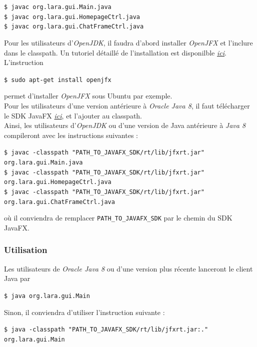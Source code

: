 \documentclass[10pt,a4paper]{article}
\begin{document}
\begin{center}
	\texttt{\$ javac org.lara.gui.Main.java} \\
	\texttt{\$ javac org.lara.gui.HomepageCtrl.java}\\
	\texttt{\$ javac org.lara.gui.ChatFrameCtrl.java}
\end{center}

Pour les utilisateurs d'\textit{OpenJDK}, il faudra d'abord installer \textit{OpenJFX} et l'inclure dans le classpath. Un tutoriel détaillé de l'installation est disponilble \href{https://wiki.openjdk.java.net/display/OpenJFX/Building+OpenJFX}{\textit{ici}}. L'instruction

\begin{center}
	\texttt{\$ sudo apt-get install openjfx}
\end{center}
permet d'installer \textit{OpenJFX} sous Ubuntu par exemple. \\

Pour les utilisateurs d'une version antérieure à \textit{Oracle Java 8}, il faut télécharger le SDK JavaFX \href{https://gluonhq.com/products/javafx/}{\textit{ici}}, et l'ajouter au classpath. \\

Ainsi, les utilisateurs d'\textit{OpenJDK} ou d'une version de Java antérieure à \textit{Java 8} compileront avec les instructions suivantes :
\begin{center}
	\texttt{\$ javac -classpath "PATH\_TO\_JAVAFX\_SDK/rt/lib/jfxrt.jar" org.lara.gui.Main.java} \\
	\texttt{\$ javac -classpath "PATH\_TO\_JAVAFX\_SDK/rt/lib/jfxrt.jar" org.lara.gui.HomepageCtrl.java} \\
	\texttt{\$ javac -classpath "PATH\_TO\_JAVAFX\_SDK/rt/lib/jfxrt.jar" org.lara.gui.ChatFrameCtrl.java}
\end{center}
où il conviendra de remplacer \texttt{PATH\_TO\_JAVAFX\_SDK} par le chemin du SDK JavaFX.

\subsubsection{Utilisation}

Les utilisateurs de \textit{Oracle Java 8} ou d'une version plus récente lanceront le client Java par
\begin{center}
	\texttt{\$ java org.lara.gui.Main}
\end{center}

Sinon, il conviendra d'utiliser l'instruction suivante :
\begin{center}
	\texttt{\$ java -classpath "PATH\_TO\_JAVAFX\_SDK/rt/lib/jfxrt.jar:." org.lara.gui.Main}
\end{center}
\end{document}
